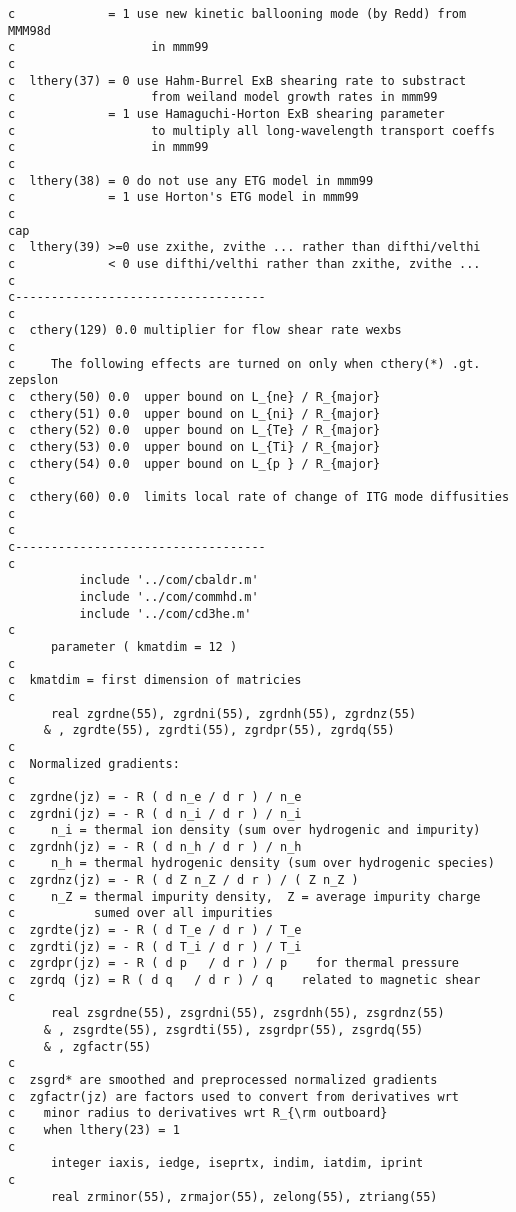 \begin{verbatim}
c             = 1 use new kinetic ballooning mode (by Redd) from MMM98d
c                   in mmm99
c
c  lthery(37) = 0 use Hahm-Burrel ExB shearing rate to substract
c                   from weiland model growth rates in mmm99
c             = 1 use Hamaguchi-Horton ExB shearing parameter
c                   to multiply all long-wavelength transport coeffs
c                   in mmm99
c
c  lthery(38) = 0 do not use any ETG model in mmm99
c             = 1 use Horton's ETG model in mmm99
c
cap
c  lthery(39) >=0 use zxithe, zvithe ... rather than difthi/velthi
c             < 0 use difthi/velthi rather than zxithe, zvithe ...
c
c-----------------------------------
c
c  cthery(129) 0.0 multiplier for flow shear rate wexbs 
c
c     The following effects are turned on only when cthery(*) .gt. zepslon
c  cthery(50) 0.0  upper bound on L_{ne} / R_{major}
c  cthery(51) 0.0  upper bound on L_{ni} / R_{major}
c  cthery(52) 0.0  upper bound on L_{Te} / R_{major}
c  cthery(53) 0.0  upper bound on L_{Ti} / R_{major}
c  cthery(54) 0.0  upper bound on L_{p } / R_{major}
c
c  cthery(60) 0.0  limits local rate of change of ITG mode diffusities
c
c
c-----------------------------------
c
          include '../com/cbaldr.m'
          include '../com/commhd.m'
          include '../com/cd3he.m'
c
      parameter ( kmatdim = 12 )
c
c  kmatdim = first dimension of matricies
c
      real zgrdne(55), zgrdni(55), zgrdnh(55), zgrdnz(55)
     & , zgrdte(55), zgrdti(55), zgrdpr(55), zgrdq(55)
c
c  Normalized gradients:
c
c  zgrdne(jz) = - R ( d n_e / d r ) / n_e
c  zgrdni(jz) = - R ( d n_i / d r ) / n_i
c     n_i = thermal ion density (sum over hydrogenic and impurity)
c  zgrdnh(jz) = - R ( d n_h / d r ) / n_h
c     n_h = thermal hydrogenic density (sum over hydrogenic species)
c  zgrdnz(jz) = - R ( d Z n_Z / d r ) / ( Z n_Z )
c     n_Z = thermal impurity density,  Z = average impurity charge
c           sumed over all impurities
c  zgrdte(jz) = - R ( d T_e / d r ) / T_e
c  zgrdti(jz) = - R ( d T_i / d r ) / T_i
c  zgrdpr(jz) = - R ( d p   / d r ) / p    for thermal pressure
c  zgrdq (jz) = R ( d q   / d r ) / q    related to magnetic shear
c
      real zsgrdne(55), zsgrdni(55), zsgrdnh(55), zsgrdnz(55)
     & , zsgrdte(55), zsgrdti(55), zsgrdpr(55), zsgrdq(55)
     & , zgfactr(55)
c
c  zsgrd* are smoothed and preprocessed normalized gradients
c  zgfactr(jz) are factors used to convert from derivatives wrt
c    minor radius to derivatives wrt R_{\rm outboard}
c    when lthery(23) = 1
c
      integer iaxis, iedge, iseprtx, indim, iatdim, iprint
c
      real zrminor(55), zrmajor(55), zelong(55), ztriang(55)

\end{verbatim}
